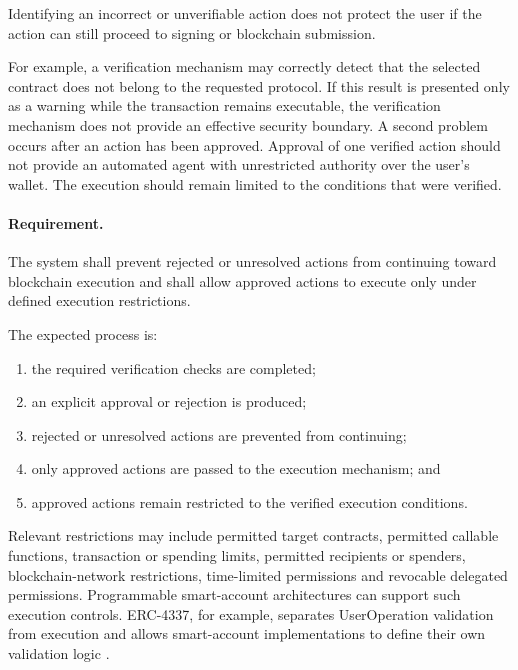 Identifying an incorrect or unverifiable action does not protect the user if the
action can still proceed to signing or blockchain submission.

For example, a verification mechanism may correctly detect that the selected
contract does not belong to the requested protocol. If this result is presented
only as a warning while the transaction remains executable, the verification
mechanism does not provide an effective security boundary. A second problem occurs after an action has been approved. Approval of one
verified action should not provide an automated agent with unrestricted
authority over the user's wallet. The execution should remain limited to the
conditions that were verified.

\paragraph{Requirement.}

The system shall prevent rejected or unresolved actions from continuing toward
blockchain execution and shall allow approved actions to execute only under
defined execution restrictions.

The expected process is:

\begin{enumerate}
    \item the required verification checks are completed;
    \item an explicit approval or rejection is produced;
    \item rejected or unresolved actions are prevented from continuing;
    \item only approved actions are passed to the execution mechanism; and
    \item approved actions remain restricted to the verified execution
    conditions.
\end{enumerate}

Relevant restrictions may include permitted target contracts,
    permitted callable functions,
     transaction or spending limits,
    permitted recipients or spenders,
     blockchain-network restrictions,
    time-limited permissions and
    revocable delegated permissions. Programmable smart-account architectures can support such execution controls.
ERC-4337, for example, separates UserOperation validation from execution and
allows smart-account implementations to define their own validation logic
\cite{buterinERC4337AccountAbstraction2021,
linMeasurementInvestigationERC43372024}.

